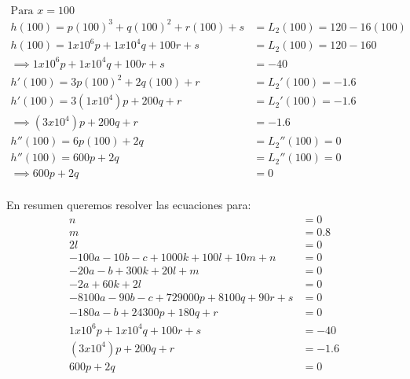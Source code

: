 \begin{align*}
	\text{Para }x=100                                                    \\
	h(100) = p(100)^3 + q(100)^2 + r(100) + s & =L_2(100) = 120-1 6(100) \\
	h(100) = 1x10^6p + 1x10^4q + 100r + s     & =L_2(100) = 120-160      \\
	\implies 1x10^6p + 1x10^4q + 100r + s     & =-40                     \\
	h'(100) =3p(100)^2 + 2q(100) + r          & =L_2'(100)=-1.6          \\
	h'(100) =3(1x10^4)p + 200q + r            & =L_2'(100)=-1.6          \\
	\implies (3x10^4)p + 200q + r             & =-1.6                    \\
	h''(100)=6p(100)+2q                       & =L_2''(100)=0            \\
	h''(100)=600p+2q                          & =L_2''(100)=0            \\
	\implies 600p+2q                          & =0                       \\
\end{align*}

En resumen queremos resolver las ecuaciones para:
\begin{align*}
	n                                            & = 0   \\
	m                                            & = 0.8 \\
	2l                                           & = 0   \\
	-100a - 10b - c + 1000k + 100l + 10m + n     & =0    \\
	-20a - b +300k + 20l + m                     & = 0   \\
	- 2a + 60k+2l                                & =0    \\
	-8100a - 90b - c + 729000p + 8100q + 90r + s & = 0   \\
	-180a - b +24300p + 180q + r                 & = 0   \\
	1x10^6p + 1x10^4q + 100r + s                 & =-40  \\
	(3x10^4)p + 200q + r                         & =-1.6 \\
	600p+2q                                      & =0    \\
\end{align*}

